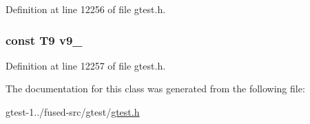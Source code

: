 \-Definition at line 12256 of file gtest.\-h.

\hypertarget{classtesting_1_1internal_1_1ValueArray37_a6356e16cf54a9dfac8525f20242af31e}{
\subsubsection[{v9\-\_\-}]{\setlength{\rightskip}{0pt plus 5cm}const \-T9 {\bf v9\-\_\-}}}\label{dc/d48/classtesting_1_1internal_1_1ValueArray37_a6356e16cf54a9dfac8525f20242af31e}


\-Definition at line 12257 of file gtest.\-h.



\-The documentation for this class was generated from the following file\-:\begin{DoxyCompactItemize}
\item 
gtest-\/1../fused-\/src/gtest/\hyperlink{fused-src_2gtest_2gtest_8h}{gtest.\-h}\end{DoxyCompactItemize}

